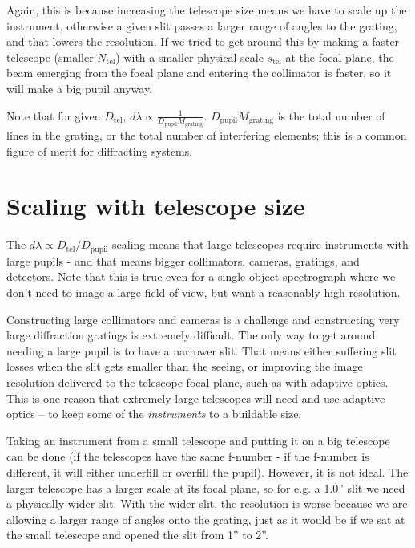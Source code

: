 \documentclass[12pt]{article}
\begin{document}
Again, this is because increasing the telescope size
means we have to scale up the instrument, otherwise a given
slit passes a larger range of angles to the grating, and that
lowers the resolution.  If we tried to get around this by
making a faster telescope (smaller $N_{\mathrm{tel}}$) with a smaller physical 
scale $s_{\mathrm{tel}}$ at the focal plane, the beam emerging from the focal 
plane and entering the collimator is faster, so it will make a
big pupil anyway.

Note that for given $D_{\mathrm{tel}}$,
$d\lambda \propto \frac{1}{D_{\mathrm{pupil}} M_{\mathrm{grating}}}$.  
$D_{\mathrm{pupil}} M_{\mathrm{grating}}$ is the total number of lines in the grating,
or the total number of interfering elements; this is a common
figure of merit for diffracting systems.

\section{Scaling with telescope size}

The $d\lambda \propto D_{\mathrm{tel}}/D_{\mathrm{pupil}}$ scaling means that large telescopes 
require 
instruments with large pupils - and that means bigger collimators, 
cameras, gratings, and detectors.  Note that this is true even for a
single-object spectrograph where we don't need to image a large field
of view, but want a reasonably high resolution.  

Constructing
large collimators and cameras is a challenge and constructing
very large diffraction gratings is extremely difficult.
The only way to get around needing a large pupil is to have
a narrower slit.  That means either suffering slit losses when the
slit gets smaller than the seeing, or improving
the image resolution delivered to the telescope focal plane, such as
with adaptive optics.  This is one reason that extremely large
telescopes will need and use adaptive optics -- to keep some of 
the {\it instruments} to a buildable size.

Taking an instrument from a small telescope and putting it on
a big telescope can be done (if the telescopes have the same 
f-number - if the f-number is different, it will either underfill
or overfill the pupil).  However, it is not ideal.  The larger
telescope has a larger scale at its focal plane, so for e.g.
a 1.0'' slit we need a physically wider slit.  With the wider
slit, the resolution is worse because we are allowing a 
larger range of angles onto the grating, just as it would 
be if we sat at the small telescope and opened the slit from 1'' to 2''.
\end{document}
